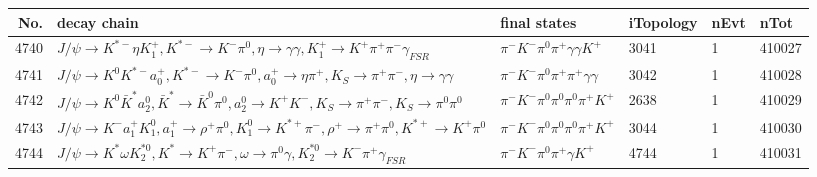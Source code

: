 \begin{table}[htbp] 
\begin{center}
\begin{small}
\begin{tabular}{rlllll}\hline\hline
 No. & decay chain & final states &  iTopology & nEvt & nTot \\\hline
4740&$J/\psi       \rightarrow K^{*-}         \eta          K_1^{+}        , K^{*-}          \rightarrow K^{-}          \pi^{0}        , \eta           \rightarrow \gamma       \gamma       , K_1^{+}         \rightarrow K^{+}          \pi^{+}        \pi^{-}        \gamma_{FSR} $&$\pi^{-}        K^{-}          \pi^{0}        \pi^{+}        \gamma       \gamma       K^{+}          $& 3041&    1&410027\\
4741&$J/\psi       \rightarrow K^{0}          K^{*-}         a_{0}^{+}      , K^{*-}          \rightarrow K^{-}          \pi^{0}        , a_{0}^{+}       \rightarrow \eta          \pi^{+}        , K_{S}           \rightarrow \pi^{+}        \pi^{-}        , \eta           \rightarrow \gamma       \gamma       $&$\pi^{-}        K^{-}          \pi^{0}        \pi^{+}        \pi^{+}        \gamma       \gamma       $& 3042&    1&410028\\
4742&$J/\psi       \rightarrow K^{0}          \bar{K}^{*}   a_{2}^{0}      , \bar{K}^{*}    \rightarrow \bar{K}^{0}   \pi^{0}        , a_{2}^{0}       \rightarrow K^{+}          K^{-}          , K_{S}           \rightarrow \pi^{+}        \pi^{-}        , K_{S}           \rightarrow \pi^{0}        \pi^{0}        $&$\pi^{-}        K^{-}          \pi^{0}        \pi^{0}        \pi^{0}        \pi^{+}        K^{+}          $& 2638&    1&410029\\
4743&$J/\psi       \rightarrow K^{-}          a_{1}^{+}      K_1^{0}        , a_{1}^{+}       \rightarrow \rho^{+}      \pi^{0}        , K_1^{0}         \rightarrow K^{*+}         \pi^{-}        , \rho^{+}       \rightarrow \pi^{+}        \pi^{0}        , K^{*+}          \rightarrow K^{+}          \pi^{0}        $&$\pi^{-}        K^{-}          \pi^{0}        \pi^{0}        \pi^{0}        \pi^{+}        K^{+}          $& 3044&    1&410030\\
4744&$J/\psi       \rightarrow K^{*}          \omega         K_2^{*0}       , K^{*}           \rightarrow K^{+}          \pi^{-}        , \omega          \rightarrow \pi^{0}        \gamma       , K_2^{*0}        \rightarrow K^{-}          \pi^{+}        \gamma_{FSR} $&$\pi^{-}        K^{-}          \pi^{0}        \pi^{+}        \gamma       K^{+}          $& 4744&    1&410031\\

\end{tabular}
\end{small}
\end{center}
\end{table}
